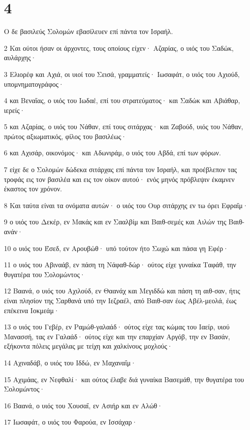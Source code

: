 \chapter{4}

\par Ο δε βασιλεύς Σολομών εβασίλευεν επί πάντα τον Ισραήλ.
\par 2 Και ούτοι ήσαν οι άρχοντες, τους οποίους είχεν· Αζαρίας, ο υιός του Σαδώκ, αυλάρχης·
\par 3 Ελιορέφ και Αχιά, οι υιοί του Σεισά, γραμματείς· Ιωσαφάτ, ο υιός του Αχιούδ, υπομνηματογράφος·
\par 4 και Βεναΐας, ο υιός του Ιωδαέ, επί του στρατεύματος· και Σαδώκ και Αβιάθαρ, ιερείς·
\par 5 και Αζαρίας, ο υιός του Νάθαν, επί τους σιτάρχας· και Ζαβούδ, υιός του Νάθαν, πρώτος αξιωματικός, φίλος του βασιλέως·
\par 6 και Αχισάρ, οικονόμος· και Αδωνιράμ, ο υιός του Αβδά, επί των φόρων.
\par 7 είχε δε ο Σολομών δώδεκα σιτάρχας επί πάντα τον Ισραήλ, και προέβλεπον τας τροφάς εις τον βασιλέα και εις τον οίκον αυτού· ενός μηνός πρόβλεψιν έκαμνεν έκαστος τον χρόνον.
\par 8 Και ταύτα είναι τα ονόματα αυτών· ο υιός του Ουρ σιτάρχης εν τω όρει Εφραΐμ·
\par 9 ο υιός του Δεκέρ, εν Μακάς και εν Σααλβίμ και Βαιθ-σεμές και Αιλών της Βαιθ-ανάν·
\par 10 ο υιός του Έσεδ, εν Αρουβώθ· υπό τούτον ήτο Σωχώ και πάσα γη Εφέρ·
\par 11 ο υιός του Αβιναάβ, εν πάση τη Νάφαθ-δώρ· ούτος είχε γυναίκα Ταφάθ, την θυγατέρα του Σολομώντος·
\par 12 Βαανά, ο υιός του Αχιλούδ, εν Θαανάχ και Μεγιδδώ και πάση τη αιθ-σαν, ήτις είναι πλησίον της Σαρθανά υπό την Ιεζραέλ, από Βαιθ-σαν έως Αβέλ-μεολά, έως επέκεινα Ιοκμεάμ·
\par 13 ο υιός του Γεβέρ, εν Ραμώθ-γαλαάδ· ούτος είχε τας κώμας του Ιαείρ, υιού Μανασσή, τας εν Γαλαάδ· ούτος είχε και την επαρχίαν Αργόβ, την εν Βασάν, εξήκοντα πόλεις μεγάλας με τείχη και χαλκίνους μοχλούς·
\par 14 Αχιναδάβ, ο υιός του Ιδδώ, εν Μαχαναΐμ·
\par 15 Αχιμάας, εν Νεφθαλί· και ούτος έλαβε διά γυναίκα Βασεμάθ, την θυγατέρα του Σολομώντος·
\par 16 Βαανά, ο υιός του Χουσαΐ, εν Ασιήρ και εν Αλώθ·
\par 17 Ιωσαφάτ, ο υιός του Φαρούα, εν Ισσάχαρ·
